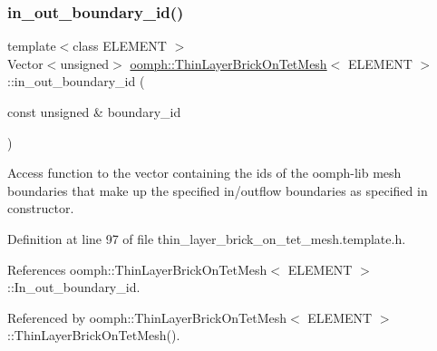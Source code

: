 \mbox{\label{classoomph_1_1ThinLayerBrickOnTetMesh_a3cfd55eb5bbd6801e9d4cd271e602cd8}} 
\subsubsection{\texorpdfstring{in\+\_\+out\+\_\+boundary\+\_\+id()}{in\_out\_boundary\_id()}}
{\footnotesize\ttfamily template$<$class E\+L\+E\+M\+E\+NT $>$ \\
Vector$<$unsigned$>$ \hyperlink{classoomph_1_1ThinLayerBrickOnTetMesh}{oomph\+::\+Thin\+Layer\+Brick\+On\+Tet\+Mesh}$<$ E\+L\+E\+M\+E\+NT $>$\+::in\+\_\+out\+\_\+boundary\+\_\+id (\begin{DoxyParamCaption}\item[{const unsigned \&}]{boundary\+\_\+id }\end{DoxyParamCaption})\hspace{0.3cm}{\ttfamily [inline]}}



Access function to the vector containing the ids of the oomph-\/lib mesh boundaries that make up the specified in/outflow boundaries as specified in constructor. 



Definition at line 97 of file thin\+\_\+layer\+\_\+brick\+\_\+on\+\_\+tet\+\_\+mesh.\+template.\+h.



References oomph\+::\+Thin\+Layer\+Brick\+On\+Tet\+Mesh$<$ E\+L\+E\+M\+E\+N\+T $>$\+::\+In\+\_\+out\+\_\+boundary\+\_\+id.



Referenced by oomph\+::\+Thin\+Layer\+Brick\+On\+Tet\+Mesh$<$ E\+L\+E\+M\+E\+N\+T $>$\+::\+Thin\+Layer\+Brick\+On\+Tet\+Mesh().

\mbox{\label{classoomph_1_1ThinLayerBrickOnTetMesh_aa753cb61dc2b1ed692dff8feeff67930}} 
